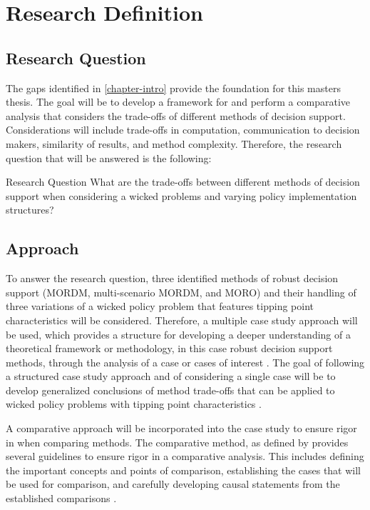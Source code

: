 \chapter{Research Definition}
\label{chapter-research}

\section{Research Question}\label{research question}

The gaps identified in \cref{chapter-intro} provide the foundation for this masters thesis. The goal will be to develop a framework for and perform a comparative analysis that considers the trade-offs of different methods of decision support. Considerations will include trade-offs in computation, communication to decision makers, similarity of results, and method complexity. Therefore, the research question that will be answered is the following: 

\begin{researchquestion}{Research Question}\label{research-question}
    What are the trade-offs between different methods of decision support when considering a wicked problems and varying policy implementation structures? 
\end{researchquestion}

\section{Approach}
To answer the research question, three identified methods of robust decision support (MORDM, multi-scenario MORDM, and MORO) and their handling of three variations of a wicked policy problem that features tipping point characteristics will be considered. Therefore, a multiple case study approach will be used, which provides a structure for developing a deeper understanding of a theoretical framework or methodology, in this case robust decision support methods, through the analysis of a case or cases of interest \citep{Edwards1998}. The goal of following a structured case study approach and of considering a single case will be to develop generalized conclusions of method trade-offs that can be applied to wicked policy problems with tipping point characteristics \citep{Seawright2008}.

A comparative approach will be incorporated into the case study to ensure rigor in when comparing methods. The comparative method, as defined by \citet{Pennings2006} provides several guidelines to ensure rigor in a comparative analysis. This includes defining the important concepts and points of comparison, establishing the cases that will be used for comparison, and carefully developing causal statements from the established comparisons \citep{Pennings2006}. 

